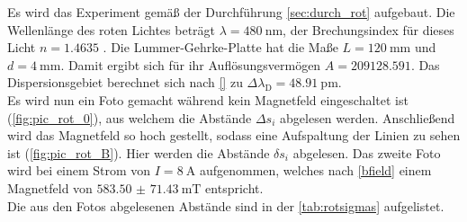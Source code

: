  \noindent Es wird das Experiment gemäß der Durchführung \ref{sec:durch_rot} aufgebaut. Die Wellenlänge des roten Lichtes beträgt 
  $\lambda = \SI{480}{\nano\metre}$, der Brechungsindex für dieses Licht $n = \num{1.4635}$ \cite{V27}. Die Lummer-Gehrke-Platte hat die 
  Maße $L = \SI{120}{\milli\metre}$ und $d = \SI{4}{\milli\metre}$. Damit ergibt sich für ihr Auflösungsvermögen $ A = \num{209128.591}$. 
  Das Dispersionsgebiet berechnet sich nach \eqref{} zu $\Delta \lambda_\text{D} = \SI{48.91}{\pico\metre}$. \\ 

  \noindent 
  Es wird nun ein Foto gemacht während kein Magnetfeld eingeschaltet ist (\autoref{fig:pic_rot_0}), aus welchem die Abstände $\Delta s_i$ 
  abgelesen werden. Anschließend wird das Magnetfeld so hoch gestellt, sodass eine Aufspaltung der Linien zu sehen ist (\autoref{fig:pic_rot_B}). 
  Hier werden die Abstände $\delta s_i$ abgelesen.  
  Das zweite Foto wird bei einem Strom von $I = \SI{8}{\ampere}$ aufgenommen, welches nach \eqref{bfield} einem Magnetfeld von $\SI{583.50(7143)}{\milli\tesla}$
  entspricht. \\
  Die aus den Fotos abgelesenen Abstände sind in der \autoref{tab:rotsigmas} aufgelistet. 
